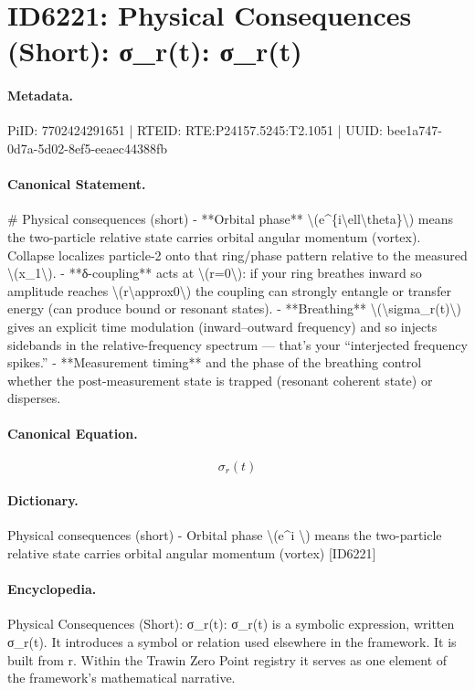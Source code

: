 \section*{ID6221: Physical Consequences (Short): σ\_r(t): σ\_r(t)}
\paragraph{Metadata.}
PiID: 7702424291651 | RTEID: RTE:P24157.5245:T2.1051 | UUID: bee1a747-0d7a-5d02-8ef5-eeaec44388fb

\paragraph{Canonical Statement.}
\# Physical consequences (short) - **Orbital phase** \textbackslash{}(e\textasciicircum{}\{i\textbackslash{}ell\textbackslash{}theta\}\textbackslash{}) means the two-particle relative state carries orbital angular momentum (vortex). Collapse localizes particle-2 onto that ring/phase pattern relative to the measured \textbackslash{}(x\_1\textbackslash{}). - **δ-coupling** acts at \textbackslash{}(r=0\textbackslash{}): if your ring breathes inward so amplitude reaches \textbackslash{}(r\textbackslash{}approx0\textbackslash{}) the coupling can strongly entangle or transfer energy (can produce bound or resonant states). - **Breathing** \textbackslash{}(\textbackslash{}sigma\_r(t)\textbackslash{}) gives an explicit time modulation (inward–outward frequency) and so injects sidebands in the relative-frequency spectrum — that’s your “interjected frequency spikes.” - **Measurement timing** and the phase of the breathing control whether the post-measurement state is trapped (resonant coherent state) or disperses.

\paragraph{Canonical Equation.}
\[
\sigma_r(t)
\]

\paragraph{Dictionary.}
Physical consequences (short) - Orbital phase \textbackslash{}(e\textasciicircum{}i \textbackslash{}) means the two-particle relative state carries orbital angular momentum (vortex) [ID6221]

\paragraph{Encyclopedia.}
Physical Consequences (Short): σ\_r(t): σ\_r(t) is a symbolic expression, written σ\_r(t). It introduces a symbol or relation used elsewhere in the framework. It is built from r. Within the Trawin Zero Point registry it serves as one element of the framework's mathematical narrative.
